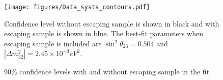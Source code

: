 \begin{figure}[!th]
\centering
\texttt{[image: figures/Data\_systs\_contours.pdf]}
\caption{90\% confidence levels with and without escaping sample in the fit}
{Confidence level without escaping sample is shown in black and with escaping sample is shown in blue. The best-fit 
parameters when escaping sample is included are $\sin^2\theta_{23} = 0.504$ and $|\Delta m^2_{32}| = 2.45\times 10^{-3} eV^2$.}
\label{fig:contpurd_cont_uncont}
\end{figure}

